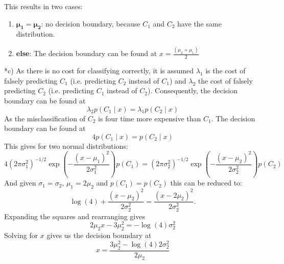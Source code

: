 \documentclass[12pt]{article}
\begin{document}
\begin{section}
\begin{subsection}
		This results in two cases:
		\begin{enumerate}
			\item $\boldsymbol{\mu_1=\mu_2}$: no decision boundary, because $C_1$ and $C_2$ have the same distribution.
			\item \textbf{else}: The decision boundary can be found at $x=\frac{(\mu_2+\mu_1)}{2}$
		\end{enumerate}
	\end{subsection}
	\begin{subsection}*{c)}
		As there is no cost for classifying correctly, it is assumed $\lambda_1$ is the cost of falsely predicting $C_1$ (i.e. predicting $C_2$ instead of $C_1$) and $\lambda_2$ the cost of falsely predicting $C_2$ (i.e. predicting $C_1$ instead of $C_2$).
		Consequently, the decision boundary can be found at
		\[
		\lambda_2 p(C_1\mid x)=\lambda_1 p(C_2\mid x)
		\]
		As the misclassification of $C_2$ is four time more expensive than $C_1$.
		The decision boundary can be found at 
		\[
		4 p(C_1\mid x)= p(C_2\mid x)
		\]
		This gives for two normal distributions:
		\begin{equation*}
		4(2\pi\sigma_1^2)^{-1/2}\exp(-\frac{(x-\mu_1)^2}{2\sigma_1^2})p(C_1)= (2\pi\sigma_2^2)^{-1/2}\exp(-\frac{(x-\mu_2)^2}{2\sigma_2^2})p(C_2)
		\end{equation*}
		And given $\sigma_1=\sigma_2$, $\mu_1=2\mu_2$ and $p(C_1)=p(C_2)$ this can be reduced to:
		\begin{equation*}
		\log(4)+\frac{(x-\mu_2)^2}{2\sigma_2^2}=\frac{(x-2\mu_2)^2}{2\sigma_2^2}.
		\end{equation*}
		Expanding the squares and rearranging gives
		\begin{equation*}
		2\mu_2x-3\mu_2^2=-\log(4)\sigma_2^2
		\end{equation*}
		Solving for $x$ gives us the decision boundary at 
		\[
		x=\frac{3\mu_2^2-\log(4)2\sigma_2^2}{2\mu_2}
		\]
	\end{subsection}
\end{section}
\end{document}
